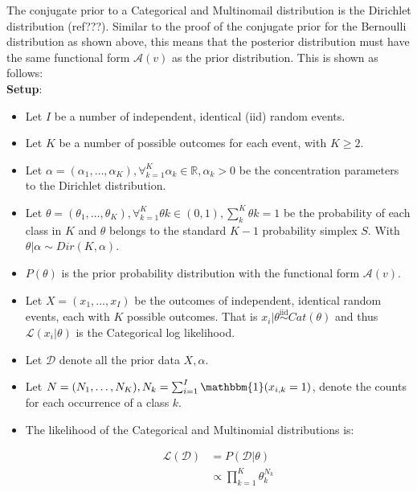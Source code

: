 The conjugate prior to a Categorical and Multinomail distribution is the Dirichlet distribution (ref???). Similar to the proof of the conjugate prior for the Bernoulli distribution as shown above, this means that the posterior distribution must have the same functional form $\mathcal{A}(v)$ as the prior distribution. This is shown as follows: \\
\textbf{Setup}:

\begin{itemize}
	\item Let $I$ be a number of independent, identical (iid) random events.
	\item Let $K$ be a number of possible outcomes for each event, with $K \geq 2$.
	\item Let $\alpha = (\alpha_{1}, \dots, \alpha_{K}), \forall_{k=1}^{K} \alpha_{k} \in \mathbb{R}, \alpha_{k} > 0$ be the concentration parameters to the Dirichlet distribution.
	\item Let $\theta = (\theta_{1}, \dots, \theta_{K}), \forall_{k=1}^{K} \theta{k} \in (0,1), \sum_{k}^{K} \theta{k} = 1$ be the probability of each class in $K$ and $\theta$ belongs to the standard $K-1$ probability simplex $S$. With $\theta | \alpha \sim Dir(K, \alpha)$. 
	\item $P(\theta)$ is the prior probability distribution with the functional form $\mathcal{A}(v)$.
	\item Let $X = (x_{1}, \dots, x_{I})$ be the outcomes of independent, identical random events, each with $K$ possible outcomes. That is $x_{i} | \theta \overset{\text{iid}}{\sim} Cat(\theta)$ and thus $\mathcal{L}(x_{i} \vert \theta)$ is the Categorical log likelihood.
	\item Let $\mathcal{D}$ denote all the prior data $X, \alpha$.
	\item Let $N = (N_{1}, \dots, N_{K}), N_{k} = \sum_{i=1}^{I} \mathbbm{1}(x_{i,k} = 1)$, denote the counts for each occurrence of a class $k$.
	\item The likelihood of the Categorical and Multinomial distributions is:
	
\begin{equation}
\begin{split}
	\mathcal{L}(\mathcal{D}) &=  P(\mathcal{D} | \theta) \\
	&\propto \prod_{k=1}^{K} \theta_{k}^{N_{k}}
\end{split}
\end{equation}
\end{itemize}


